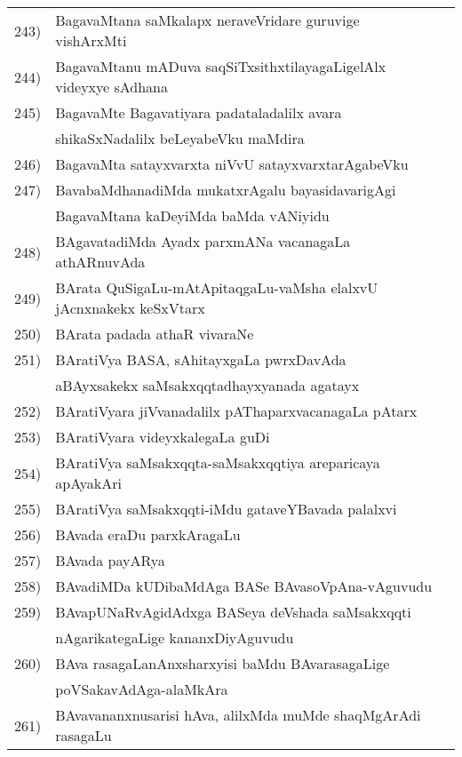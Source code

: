 {\begin{longtable}{@{}cp{7.4cm}r}
243) & BagavaMtana saMkalapx neraveVridare guruvige vishArxMti & \pageref{page71}\\
244) & BagavaMtanu mADuva saqSiTxsithxtilayagaLigelAlx videyxye sAdhana & \pageref{page101}\\
245) & BagavaMte Bagavatiyara padataladalilx avara & \\
     & shikaSxNadalilx beLeyabeVku maMdira & \pageref{page67}\\
246) & BagavaMta satayxvarxta niVvU satayxvarxtarAgabeVku & \pageref{page79}\\ 
247) & BavabaMdhanadiMda mukatxrAgalu bayasidavarigAgi & \\
     & BagavaMtana kaDeyiMda baMda vANiyidu & \pageref{page251}   \\
248) & BAgavatadiMda Ayadx parxmANa vacanagaLa athARnuvAda & \pageref{page164}\\
249) & BArata QuSigaLu-mAtApitaqgaLu-vaMsha elalxvU jAcnxnakekx keSxVtarx & \pageref{page104}\\ 
250) & BArata padada athaR vivaraNe & \pageref{20}\\
251) & BAratiVya BASA, sAhitayxgaLa pwrxDavAda & \\
     & aBAyxsakekx saMsakxqqtadhayxyanada agatayx & \pageref{page37}\\
252) & BAratiVyara jiVvanadalilx pAThaparxvacanagaLa pAtarx & \pageref{page105}\\
253) & BAratiVyara videyxkalegaLa guDi & \pageref{page22}\\
254) & BAratiVya saMsakxqqta-saMsakxqqtiya areparicaya apAyakAri & \pageref{page32}\\
255) & BAratiVya saMsakxqqti-iMdu gataveYBavada palalxvi & \pageref{page32}\\
256) & BAvada eraDu parxkAragaLu & \pageref{page230}\\
257) & BAvada payARya & \pageref{page230}\\
258) & BAvadiMDa kUDibaMdAga BASe BAvasoVpAna-vAguvudu & \pageref{page26}\\
259) & BAvapUNaRvAgidAdxga BASeya deVshada saMsakxqqti & \\
     & nAgarikategaLige kananxDiyAguvudu & \pageref{page16}\\
260) & BAva rasagaLanAnxsharxyisi baMdu BAvarasagaLige & \\
     & poVSakavAdAga-alaMkAra & \pageref{page245}\\
261) & BAvavananxnusarisi hAva, alilxMda muMde shaqMgArAdi rasagaLu &\pageref{page226}\\

\end{longtable}}
